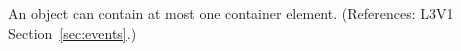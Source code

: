 An \Event object can contain at most one 
container element. (References: L3V1 Section~\ref{sec:events}.)
